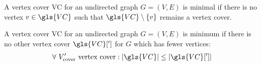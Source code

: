 
\begin{definition}
  A vertex cover \gls{VC} for an undirected graph
  \(G=(V,E)\) is minimal if there is no vertex
  \(v \in \gls{VC}\) such that
  \(\gls{VC} \setminus \{v\}\) remains a vertex cover.
\end{definition}


\begin{definition}
  A vertex cover \gls{VC} for an undirected graph
  \(G=(V,E)\) is minimum if there is no other vertex cover
  \(\gls{VC}[']\) for \(G\) which has fewer vertices:
  \[
    \forall~V_{\text{cover}}'\text{ vertex cover} :
    |\gls{VC}| \leq |\gls{VC}[']|
  \]
\end{definition}

